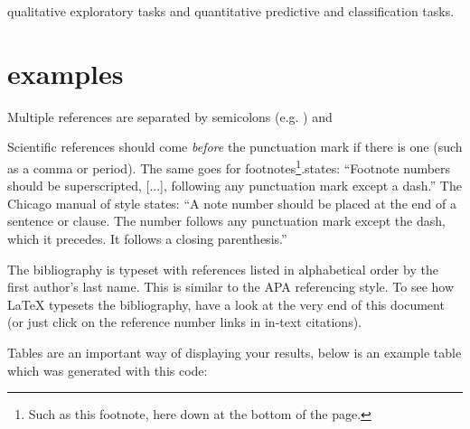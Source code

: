 



qualitative exploratory tasks and quantitative predictive and classification tasks.





\section{examples}
\cite{Blei:2006:DTM:1143844.1143859}
\citep{Chang:Boyd-Graber:Wang:Gerrish:Blei-2009}
\citep{DBLP:journals/corr/RosnerHRNB14}
\citep{DBLP:journals/corr/abs-1206-3298}
\citep{Hall:2008:SHI:1613715.1613763}
\citep{Wang:2006:TOT:1150402.1150450}
\cite{conf/icdm/AlSumaitBD08}
\citep{icml2010_GerrishB10}

Multiple references are separated by semicolons (e.g. \parencite{Blei:2006:DTM:1143844.1143859, Wang:2006:TOT:1150402.1150450}) and 

Scientific references should come \emph{before} the punctuation mark if there is one (such as a comma or period). The same goes for footnotes\footnote{Such as this footnote, here down at the bottom of the page.}.states: \enquote{Footnote numbers should be superscripted, [...], following any punctuation mark except a dash.} The Chicago manual of style states: \enquote{A note number should be placed at the end of a sentence or clause. The number follows any punctuation mark except the dash, which it precedes. It follows a closing parenthesis.}

The bibliography is typeset with references listed in alphabetical order by the first author's last name. This is similar to the APA referencing style. To see how \LaTeX{} typesets the bibliography, have a look at the very end of this document (or just click on the reference number links in in-text citations).


Tables are an important way of displaying your results, below is an example table which was generated with this code:

